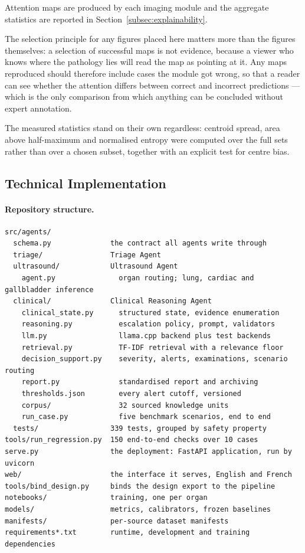 Attention maps are produced by each imaging module and the aggregate statistics are reported in
Section~\ref{subsec:explainability}.

The selection principle for any figures placed here matters more than the figures themselves: a
selection of successful maps is not evidence, because a viewer who knows where the pathology
lies will read the map as pointing at it. Any maps reproduced should therefore include cases the
module got wrong, so that a reader can see whether the attention differs between correct and
incorrect predictions --- which is the only comparison from which anything can be concluded
without expert annotation.

The measured statistics stand on their own regardless: centroid spread, area above
half-maximum and normalised entropy were computed over the full sets rather than over a chosen
subset, together with an explicit test for centre bias.

\subsection{Technical Implementation}
\label{app:implementation}

\paragraph{Repository structure.}

{\small
\begin{verbatim}
src/agents/
  schema.py              the contract all agents write through
  triage/                Triage Agent
  ultrasound/            Ultrasound Agent
    agent.py               organ routing; lung, cardiac and gallbladder inference
  clinical/              Clinical Reasoning Agent
    clinical_state.py      structured state, evidence enumeration
    reasoning.py           escalation policy, prompt, validators
    llm.py                 llama.cpp backend plus test backends
    retrieval.py           TF-IDF retrieval with a relevance floor
    decision_support.py    severity, alerts, examinations, scenario routing
    report.py              standardised report and archiving
    thresholds.json        every alert cutoff, versioned
    corpus/                32 sourced knowledge units
    run_case.py            five benchmark scenarios, end to end
  tests/                 339 tests, grouped by safety property
tools/run_regression.py  150 end-to-end checks over 10 cases
serve.py                 the deployment: FastAPI application, run by uvicorn
web/                     the interface it serves, English and French
tools/bind_design.py     binds the design export to the pipeline
notebooks/               training, one per organ
models/                  metrics, calibrators, frozen baselines
manifests/               per-source dataset manifests
requirements*.txt        runtime, development and training dependencies
\end{verbatim}
}

